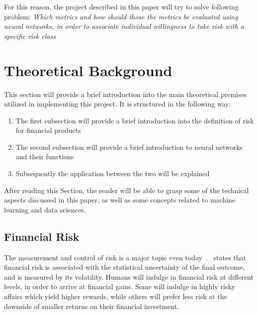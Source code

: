 \documentclass[12pt]{article}
\begin{document}
For this reason, the project described in this paper will try to solve following problem:
\textit{Which metrics and how should those the metrics be evaluated using neural networks, in order to associate individual willingness to take risk with a specific risk class}

\section{Theoretical Background}
\label{sec:theoretical_background}

This section will provide a brief introduction into the main theoretical premises utilized in implementing this project. It is structured in the following way:

\begin{enumerate}
    \item The first subsection will provide a brief introduction into the definition of risk for financial products
    \item The second subsection will provide a brief introduction to neural networks and their functions
    \item Subsequently the application between the two will be explained
\end{enumerate}

After reading this Section, the reader will be able to grasp some of the technical aspects discussed in this paper, as well as some concepts related to machine learning and data sciences.

\subsection{Financial Risk}
\label{sub:financial_risk}
The measurement and control of risk is a major topic even today~\cite{finRisk}.~\cite{finRisk} states that financial risk is associated with the statistical uncertainty of the final outcome, and is measured by its volatility. Humans will indulge in financial risk at different levels, in order to arrive at financial gains. Some will indulge in highly risky affairs which yield higher rewards, while others will prefer less risk at the downside of smaller returns on their financial investment.
\end{document}

